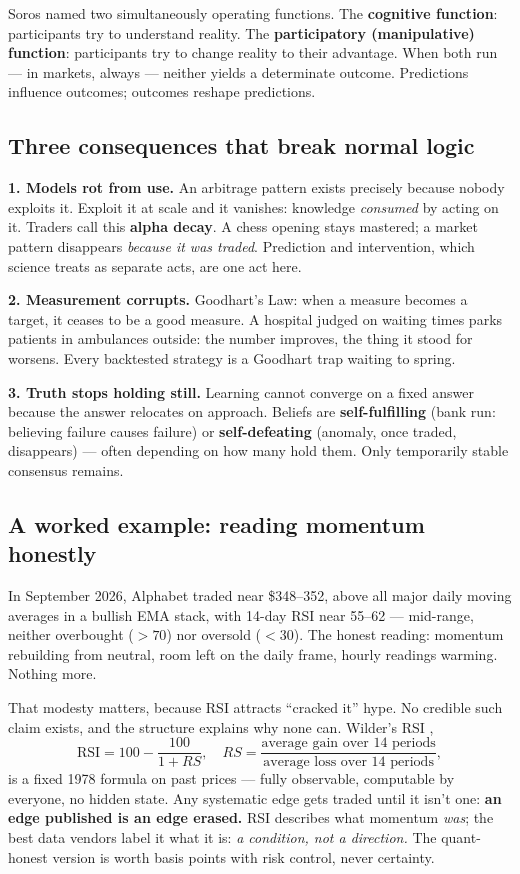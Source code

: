 \documentclass[11pt]{article}
\begin{document}
Soros named two simultaneously operating functions. The \textbf{cognitive function}: participants try to understand reality. The \textbf{participatory (manipulative) function}: participants try to change reality to their advantage. When both run --- in markets, always --- neither yields a determinate outcome. Predictions influence outcomes; outcomes reshape predictions.

\subsection{Three consequences that break normal logic}

\textbf{1. Models rot from use.} An arbitrage pattern exists precisely because nobody exploits it. Exploit it at scale and it vanishes: knowledge \emph{consumed} by acting on it. Traders call this \textbf{alpha decay}. A chess opening stays mastered; a market pattern disappears \emph{because it was traded}. Prediction and intervention, which science treats as separate acts, are one act here.

\textbf{2. Measurement corrupts.} Goodhart's Law: when a measure becomes a target, it ceases to be a good measure. A hospital judged on waiting times parks patients in ambulances outside: the number improves, the thing it stood for worsens. Every backtested strategy is a Goodhart trap waiting to spring.

\textbf{3. Truth stops holding still.} Learning cannot converge on a fixed answer because the answer relocates on approach. Beliefs are \textbf{self-fulfilling} (bank run: believing failure causes failure) or \textbf{self-defeating} (anomaly, once traded, disappears) --- often depending on how many hold them. Only temporarily stable consensus remains.

\subsection{A worked example: reading momentum honestly}

In September 2026, Alphabet traded near \$348--352, above all major daily moving averages in a bullish EMA stack, with 14-day RSI near 55--62 --- mid-range, neither overbought ($>70$) nor oversold ($<30$). The honest reading: momentum rebuilding from neutral, room left on the daily frame, hourly readings warming. Nothing more.

That modesty matters, because RSI attracts ``cracked it'' hype. No credible such claim exists, and the structure explains why none can. Wilder's RSI \citep{wilder1978},
\begin{equation}
\mathrm{RSI} = 100 - \frac{100}{1 + RS}, \quad RS = \frac{\text{average gain over 14 periods}}{\text{average loss over 14 periods}},
\end{equation}
is a fixed 1978 formula on past prices --- fully observable, computable by everyone, no hidden state. Any systematic edge gets traded until it isn't one: \textbf{an edge published is an edge erased.} RSI describes what momentum \emph{was}; the best data vendors label it what it is: \emph{a condition, not a direction.} The quant-honest version is worth basis points with risk control, never certainty.
\end{document}
